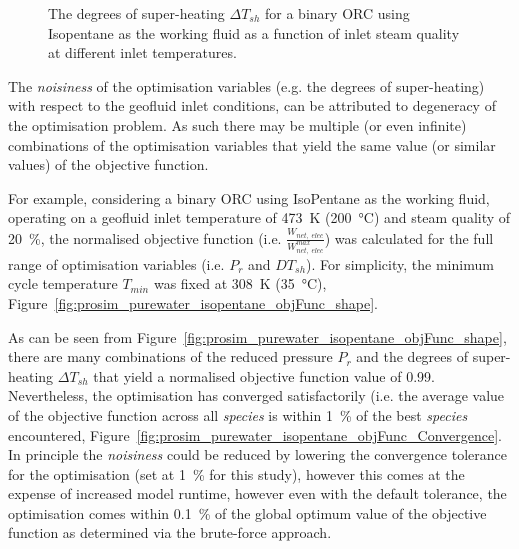 \begin{itemize}
        \begin{figure}[H]
            \centering
            
            \caption[The degrees of super-heating \(\Delta T_{sh}\) for a binary \ac{ORC} using Isopentane.]{The degrees of super-heating \(\Delta T_{sh}\) for a binary \ac{ORC} using Isopentane as the working fluid as a function of inlet steam quality at different inlet temperatures.}
            \label{fig:prosim_purewater_isopentane_DTsh}
        \end{figure}

    \end{itemize}

    The \emph{noisiness} of the optimisation variables (e.g. the degrees of super-heating) with respect to the geofluid inlet conditions, can be attributed to degeneracy of the optimisation problem. As such there may be multiple (or even infinite) combinations of the optimisation variables that yield the same value (or similar values) of the objective function. 
    
    For example, considering a binary \ac{ORC} using IsoPentane as the working fluid, operating on a geofluid inlet temperature of \qty{473}{\K} (\qty{200}{\degreeCelsius}) and steam quality of \qty{20}{\percent}, the normalised objective function (i.e. \(\frac{W_{net,\;elec}}{W_{net,\;elec}^{max}}\)) was calculated for the full range of optimisation variables (i.e. \(P_r\) and \(DT_{sh}\)). For simplicity, the minimum cycle temperature \(T_{min}\) was fixed at \qty{308}{\K} (\qty{35}{\degreeCelsius}), Figure~\ref{fig:prosim_purewater_isopentane_objFunc_shape}.

    As can be seen from Figure~\ref{fig:prosim_purewater_isopentane_objFunc_shape}, there are many combinations of the reduced pressure \(P_r\) and the degrees of super-heating \(\Delta T_{sh}\) that yield a normalised objective function value of \num{0.99}. Nevertheless, the optimisation has converged satisfactorily (i.e. the average value of the objective function across all \emph{species} is within \qty{1}{\percent} of the best \emph{species} encountered, Figure~\ref{fig:prosim_purewater_isopentane_objFunc_Convergence}. In principle the \emph{noisiness} could be reduced by lowering the convergence tolerance for the optimisation (set at \qty{1}{\percent} for this study), however this comes at the expense of increased model runtime, however even with the default tolerance, the optimisation comes within \qty{0.1}{\percent} of the global optimum value of the objective function as determined via the brute-force approach.

